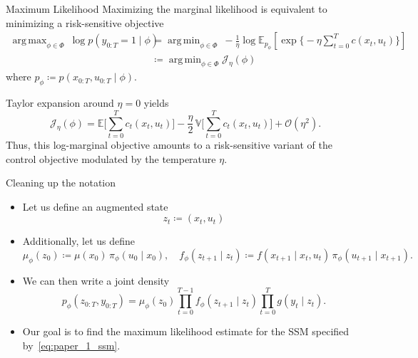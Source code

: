 \documentclass[10pt, aspectratio=1610]{beamer}
\DeclareMathOperator*{\argmin}{arg\,min}
\DeclareMathOperator*{\argmax}{arg\,max}
\begin{document}
    \begin{frame}{Maximum Likelihood}
      Maximizing the marginal likelihood is equivalent to minimizing a risk-sensitive objective
      \begin{align}\label{eq:max_likelihood}
        \argmax_{\phi \in \Phi} \medspace \log p(y_{0:T} = 1 \mid \phi) &= \argmin_{\phi \in \Phi} \medspace -\frac{1}{\eta}\log \mathbb{E}_{p_{\phi}} \left[ \exp \big\{-\eta \textstyle \sum_{t=0}^{T} c(x_{t}, u_{t}) \big\} \right] \\
        &\coloneq \argmin_{\phi \in \Phi} \mathcal{J}_\eta(\phi)
      \end{align}
      where $p_{\phi} \coloneqq p(x_{0:T}, u_{0:T} \mid \phi)$.

      \vskip 0.5cm
      Taylor expansion around $\eta = 0$ yields
      \begin{equation}
        \mathcal{J}_\eta(\phi) = \mathbb{E} \Bigg[ \sum_{t=0}^{T} c_{t}(x_{t}, u_{t}) \Bigg] - \frac{\eta}{2} \, \mathbb{V} \Bigg[ \sum_{t=0}^{T} c_{t}(x_{t}, u_{t}) \Bigg] + \mathcal{O}(\eta^{2}).
      \end{equation}
      Thus, this log-marginal objective amounts to a risk-sensitive variant of the control objective modulated by the temperature $\eta$.
    \end{frame}

    \begin{frame}{Cleaning up the notation}
      \begin{itemize}
        \item Let us define an augmented state
          \begin{equation}
            z_t \coloneq (x_t, u_t)
          \end{equation}
        \item Additionally, let us define
          \begin{equation}
            \mu_{\phi}(z_0) \coloneqq \mu(x_0) \, \pi_{\phi}(u_0 \mid x_0), \quad f_{\phi}(z_{t+1} \mid z_t) \coloneqq f(x_{t+1} \mid x_t, u_t) \, \pi_{\phi}(u_{t+1} \mid x_{t+1}).
          \end{equation}
        \item We can then write a joint density
          \begin{equation}\label{eq:paper_1_ssm}
            p_{\phi}(z_{0:T}, y_{0:T}) = \mu_{\phi}(z_0) \prod_{t=0}^{T-1} f_{\phi}(z_{t+1} \mid z_t) \prod_{t=0}^T g(y_t \mid z_t).
          \end{equation}
        \item Our goal is to find the maximum likelihood estimate for the SSM specified by~\eqref{eq:paper_1_ssm}.
      \end{itemize}
    \end{frame}
\end{document}
